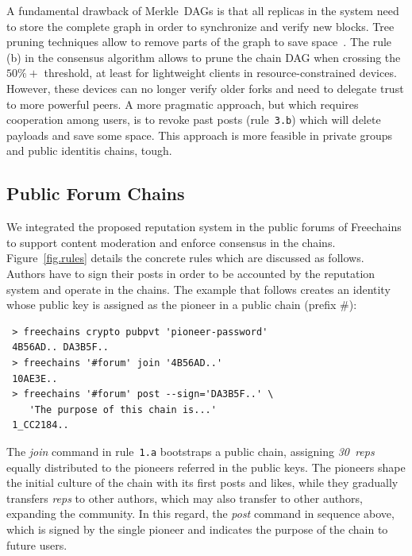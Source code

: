 \documentclass[10pt,journal,compsoc]{IEEEtran}
\newcommand{\FC}       {Freechains\xspace}
\newcommand{\reps}     {\emph{reps}\xspace}
\newcommand{\nreps}[1] {\emph{#1~reps\xspace}}
\begin{document}
A fundamental drawback of Merkle~DAGs is that all replicas in the system need
to store the complete graph in order to synchronize and verify new blocks.
Tree pruning techniques allow to remove parts of the graph to save
space~\cite{p2p.prune}.
The rule (b) in the consensus algorithm allows to prune the chain DAG when
crossing the $50\%+$ threshold, at least for lightweight clients in
resource-constrained devices.
However, these devices can no longer verify older forks and need to delegate
trust to more powerful peers.
%
A more pragmatic approach, but which requires cooperation among users, is to
revoke past posts (rule~\texttt{3.b}) which will delete payloads and save some
space.
This approach is more feasible in private groups and public identitis chains,
tough.

\subsection{Public Forum Chains}
\label{sec.consensus.chains}

We integrated the proposed reputation system in the public forums of \FC to
support content moderation and enforce consensus in the chains.
Figure~\ref{fig.rules} details the concrete rules which are discussed as
follows.
Authors have to sign their posts in order to be accounted by the reputation
system and operate in the chains.
The example that follows creates an identity whose public key is assigned as
the pioneer in a public chain (prefix $\#$):

{\footnotesize
\begin{verbatim}
 > freechains crypto pubpvt 'pioneer-password'
 4B56AD.. DA3B5F..
 > freechains '#forum' join '4B56AD..'
 10AE3E..
 > freechains '#forum' post --sign='DA3B5F..' \
    'The purpose of this chain is...'
 1_CC2184..
\end{verbatim}
}

The \emph{join} command in rule~\texttt{1.a} bootstraps a public chain,
assigning \nreps{30} equally distributed to the pioneers referred in the public
keys.
The pioneers shape the initial culture of the chain with its first posts and
likes, while they gradually transfers \reps to other authors, which may also
transfer to other authors, expanding the community.
%
In this regard, the \emph{post} command in sequence above, which is signed by
the single pioneer and indicates the purpose of the chain to future users.
\end{document}
